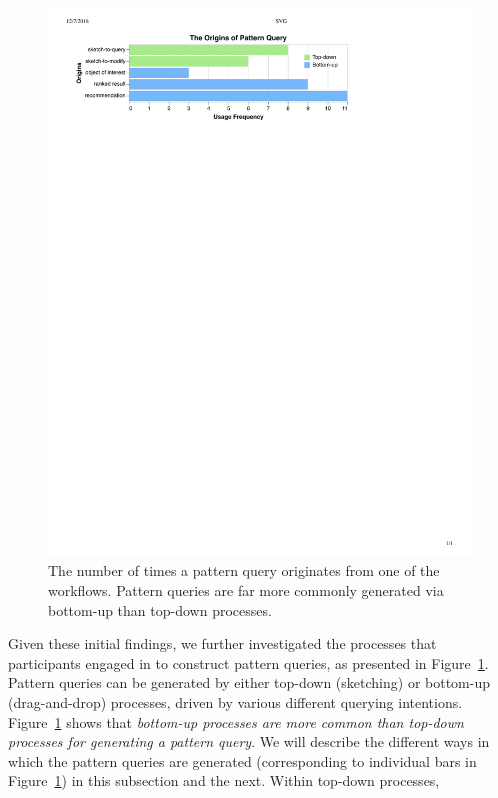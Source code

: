  \begin{figure}[h!]
   \includegraphics[width=0.95\linewidth]{figures/the_origins_of_sketch.pdf}
   \vspace{-5pt}
   \caption{The number of times a pattern query originates from one of the workflows. Pattern queries are far more commonly generated via bottom-up than top-down processes.}\label{fig:origins_of_sketch}
   \vspace{-5pt}
 \end{figure}
 \par Given these initial findings,
 we further investigated the processes that participants engaged in to construct pattern queries, as presented in Figure~\ref{fig:origins_of_sketch}.
 Pattern queries can be generated by
 either top-down (sketching) or
 bottom-up (drag-and-drop) processes,
 driven by various different querying intentions. Figure~\ref{fig:origins_of_sketch} shows that
 \emph{bottom-up processes are more common
 than top-down processes for generating a pattern query}. We will describe the different ways in which the pattern queries are generated (corresponding to individual bars in Figure~\ref{fig:origins_of_sketch}) in this subsection and the next. Within top-down processes,
